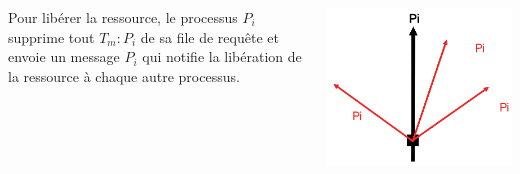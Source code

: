 \documentclass[compress]{beamer}
\begin{document}
\begin{frame}
		\begin{columns}
    	\begin{column}{.6\textwidth}
			Pour libérer la ressource, le processus $P_i$ supprime tout $T_m : P_i$ de sa file de requête et envoie un message $P_i$ qui notifie la libération de la ressource à chaque autre processus.
		\end{column}
		\begin{column}{.4\textwidth}
		\begin{center}
				\includegraphics[scale=0.5]{process10.png}
		\end{center}
		\end{column}
	\end{columns}
\end{frame}
\end{document}

